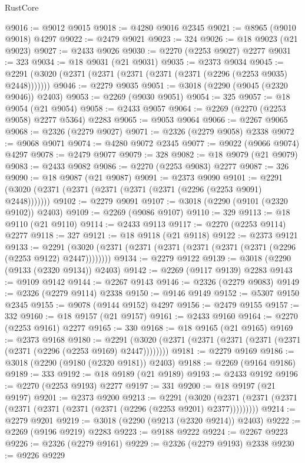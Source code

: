 \begin{lexlean}{RustCore}
\begin{coremodule}
@9016 := @9012 @9015
@9018 := @4280 @9016 @2345
@9021 := @8965 (@9010 @9018) @4297
@9022 := @2479 @9021
@9023 := 324
@9026 := @18 @9023 (@21 @9023)
@9027 := @2433 @9026
@9030 := @2270 (@2253 @9027) @2277
@9031 := 323
@9034 := @18 @9031 (@21 @9031)
@9035 := @2373 @9034
@9045 := @2291 (@3020 (@2371 (@2371 (@2371 (@2371 (@2371 (@2296 (@2253 @9035) @2448)))))))
@9046 := @2279 @9035
@9051 := @3018 (@2290 (@9045 (@2320 @9046)) @2403)
@9053 := @2269 (@9030 @9051)
@9054 := 325
@9057 := @18 @9054 (@21 @9054)
@9058 := @2433 @9057
@9064 := @2269 (@2270 (@2253 @9058) @2277 @5364) @2283
@9065 := @9053 @9064
@9066 := @2267 @9065
@9068 := @2326 (@2279 @9027)
@9071 := @2326 (@2279 @9058) @2338
@9072 := @9068 @9071
@9074 := @4280 @9072 @2345
@9077 := @9022 (@9066 @9074) @4297
@9078 := @2479 @9077
@9079 := 328
@9082 := @18 @9079 (@21 @9079)
@9083 := @2433 @9082
@9086 := @2270 (@2253 @9083) @2277
@9087 := 326
@9090 := @18 @9087 (@21 @9087)
@9091 := @2373 @9090
@9101 := @2291 (@3020 (@2371 (@2371 (@2371 (@2371 (@2371 (@2296 (@2253 @9091) @2448)))))))
@9102 := @2279 @9091
@9107 := @3018 (@2290 (@9101 (@2320 @9102)) @2403)
@9109 := @2269 (@9086 @9107)
@9110 := 329
@9113 := @18 @9110 (@21 @9110)
@9114 := @2433 @9113
@9117 := @2270 (@2253 @9114) @2277
@9118 := 327
@9121 := @18 @9118 (@21 @9118)
@9122 := @2373 @9121
@9133 := @2291 (@3020 (@2371 (@2371 (@2371 (@2371 (@2371 (@2371 (@2296 (@2253 @9122) @2447))))))))
@9134 := @2279 @9122
@9139 := @3018 (@2290 (@9133 (@2320 @9134)) @2403)
@9142 := @2269 (@9117 @9139) @2283
@9143 := @9109 @9142
@9144 := @2267 @9143
@9146 := @2326 (@2279 @9083)
@9149 := @2326 (@2279 @9114) @2338
@9150 := @9146 @9149
@9152 := @5307 @9150 @2345
@9155 := @9078 (@9144 @9152) @4297
@9156 := @2479 @9155
@9157 := 332
@9160 := @18 @9157 (@21 @9157)
@9161 := @2433 @9160
@9164 := @2270 (@2253 @9161) @2277
@9165 := 330
@9168 := @18 @9165 (@21 @9165)
@9169 := @2373 @9168
@9180 := @2291 (@3020 (@2371 (@2371 (@2371 (@2371 (@2371 (@2371 (@2296 (@2253 @9169) @2447))))))))
@9181 := @2279 @9169
@9186 := @3018 (@2290 (@9180 (@2320 @9181)) @2403)
@9188 := @2269 (@9164 @9186)
@9189 := 333
@9192 := @18 @9189 (@21 @9189)
@9193 := @2433 @9192
@9196 := @2270 (@2253 @9193) @2277
@9197 := 331
@9200 := @18 @9197 (@21 @9197)
@9201 := @2373 @9200
@9213 := @2291
    (@3020 (@2371 (@2371 (@2371 (@2371 (@2371 (@2371 (@2371 (@2296 (@2253 @9201) @2377)))))))))
@9214 := @2279 @9201
@9219 := @3018 (@2290 (@9213 (@2320 @9214)) @2403)
@9222 := @2269 (@9196 @9219) @2283
@9223 := @9188 @9222
@9224 := @2267 @9223
@9226 := @2326 (@2279 @9161)
@9229 := @2326 (@2279 @9193) @2338
@9230 := @9226 @9229

\end{coremodule}
\end{lexlean}
